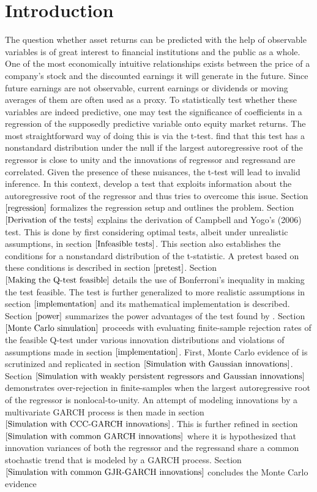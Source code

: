 \documentclass{article}
\begin{document}
\section{Introduction}
The question whether asset returns can be predicted with the help of observable variables is of great interest to financial institutions and the public as a whole. One of the most economically intuitive relationships exists between the price of a company's stock and the discounted earnings it will generate in the future. Since future earnings are not observable, current earnings or dividends or moving averages of them are often used as a proxy. To statistically test whether these variables are indeed predictive, one may test the significance of coefficients in a regression of the supposedly predictive variable onto equity market returns. The most straightforward way of doing this is via the t-test. \citet{elliott1994inference} find that this test has a nonstandard distribution under the null if the largest autoregressive root of the regressor is close to unity and the innovations of regressor and regressand are correlated. Given the presence of these nuisances, the t-test will lead to invalid inference. In this context, \citet{campbell2006efficient} develop a test that exploits information about the autoregressive root of the regressor and thus tries to overcome this issue. Section $\ref{regression}$ formalizes the regression setup and outlines the problem. Section $\ref{Derivation of the tests}$ explains the derivation of Campbell and Yogo's (2006) test. This is done by first considering optimal tests, albeit under unrealistic assumptions, in section $\ref{Infeasible tests}$. This section also establishes the conditions for a nonstandard distribution of the t-statistic. A pretest based on these conditions is described in section $\ref{pretest}$. Section $\ref{Making the Q-test feasible}$ details the use of Bonferroni's inequality in making the test feasible.  The test is further generalized to more realistic assumptions in section $\ref{implementation}$ and its mathematical implementation is described. Section $\ref{power}$ summarizes the power advantages of the test found by \citet{campbell2006efficient}. Section $\ref{Monte Carlo simulation}$ proceeds with evaluating finite-sample rejection rates of the feasible Q-test under various innovation distributions and violations of assumptions made in section $\ref{implementation}$. First, Monte Carlo evidence of \citet{campbell2006efficient} is scrutinized and replicated in section $\ref{Simulation with Gaussian innovations}$. Section $\ref{Simulation with weakly persistent regressors and Gaussian innovations}$ demonstrates over-rejection in finite-samples when the largest autoregressive root of the regressor is nonlocal-to-unity. An attempt of modeling innovations by a multivariate GARCH process is then made in section $\ref{Simulation with CCC-GARCH innovations}$. This is further refined in section $\ref{Simulation with common GARCH innovations}$ where it is hypothesized that innovation variances of both the regressor and the regressand share a common stochastic trend that is modeled by a GARCH process. Section $\ref{Simulation with common GJR-GARCH innovations}$ concludes the Monte Carlo evidence 
\end{document}
